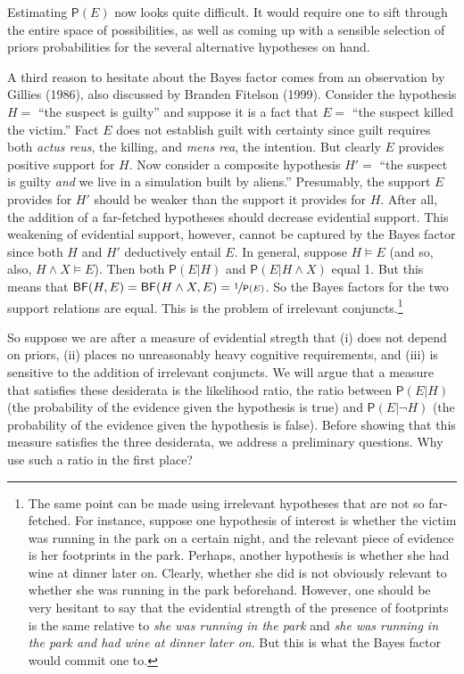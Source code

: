 \documentclass[
  10pt,
  dvipsnames,enabledeprecatedfontcommands]{scrartcl}
\newcommand{\et}{\wedge}
\newcommand{\pr}[1]{\mathsf{P}(#1)}
\begin{document}
\noindent Estimating \(\pr{E}\) now looks quite difficult. It would
require one to sift through the entire space of possibilities, as well
as coming up with a sensible selection of priors probabilities for the
several alternative hypotheses on hand.

A third reason to hesitate about the Bayes factor comes from an
observation by Gillies (1986), also discussed by Branden Fitelson
(1999). Consider the hypothesis \(H =\) ``the suspect is guilty'' and
suppose it is a fact that \(E =\) ``the suspect killed the victim.''
Fact \(E\) does not establish guilt with certainty since guilt requires
both \emph{actus reus}, the killing, and \emph{mens rea}, the intention.
But clearly \(E\) provides positive support for \(H\). Now consider a
composite hypothesis \(H'=\) ``the suspect is guilty \textit{and} we
live in a simulation built by aliens.'' Presumably, the support \(E\)
provides for \(H'\) should be weaker than the support it provides for
\(H\). After all, the addition of a far-fetched hypotheses should
decrease evidential support. This weakening of evidential support,
however, cannot be captured by the Bayes factor since both \(H\) and
\(H'\) deductively entail \(E\). In general, suppose \(H\models E\) (and
so, also, \(H \et X \models E\)). Then both \(\pr{E\vert H}\) and
\(\pr{E \vert H \et X}\) equal 1. But this means that
\(\mathsf{BF}(H,E) = \mathsf{BF}(H \et X, E) = \nicefrac{1}{\pr{E}}\).
So the Bayes factors for the two support relations are equal. This is
the problem of irrelevant conjuncts.\footnote{The same point can be made
  using irrelevant hypotheses that are not so far-fetched. For instance,
  suppose one hypothesis of interest is whether the victim was running
  in the park on a certain night, and the relevant piece of evidence is
  her footprints in the park. Perhaps, another hypothesis is whether she
  had wine at dinner later on. Clearly, whether she did is not obviously
  relevant to whether she was running in the park beforehand. However,
  one should be very hesitant to say that the evidential strength of the
  presence of footprints is the same relative to
  \emph{she was running in the park} and
  \emph{she was running in the park and had wine at dinner later on}.
  But this is what the Bayes factor would commit one to.}

So suppose we are after a measure of evidential stregth that (i) does
not depend on priors, (ii) places no unreasonably heavy cognitive
requirements, and (iii) is sensitive to the addition of irrelevant
conjuncts. We will argue that a measure that satisfies these desiderata
is the likelihood ratio, the ratio between \(\pr{E \vert H}\) (the
probability of the evidence given the hypothesis is true) and
\(\pr{E \vert \neg H}\) (the probability of the evidence given the
hypothesis is false). Before showing that this measure satisfies the
three desiderata, we address a preliminary questions. Why use such a
ratio in the first place?
\end{document}
